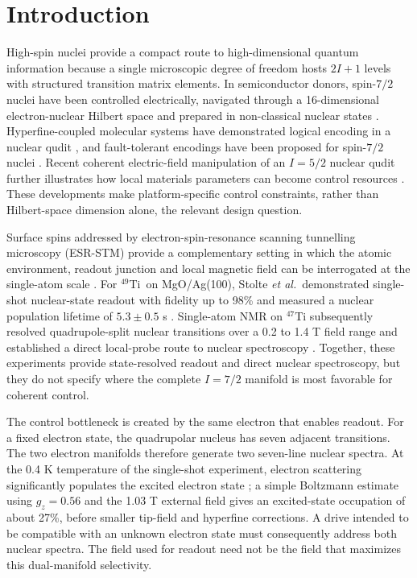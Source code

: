 \documentclass[11pt]{article}
\newcommand{\Ti}{$^{49}$Ti}
\begin{document}
\section{Introduction}
High-spin nuclei provide a compact route to high-dimensional quantum information because a single microscopic degree of freedom hosts $2I+1$ levels with structured transition matrix elements. In semiconductor donors, spin-$7/2$ nuclei have been controlled electrically, navigated through a 16-dimensional electron-nuclear Hilbert space and prepared in non-classical nuclear states \cite{asaad2020,fernandez2024,yu2025}. Hyperfine-coupled molecular systems have demonstrated logical encoding in a nuclear qudit \cite{lim2025prl}, and fault-tolerant encodings have been proposed for spin-$7/2$ nuclei \cite{lim2023pra}. Recent coherent electric-field manipulation of an $I=5/2$ nuclear qudit further illustrates how local materials parameters can become control resources \cite{lim2026electric}. These developments make platform-specific control constraints, rather than Hilbert-space dimension alone, the relevant design question.

Surface spins addressed by electron-spin-resonance scanning tunnelling microscopy (ESR-STM) provide a complementary setting in which the atomic environment, readout junction and local magnetic field can be interrogated at the single-atom scale \cite{willke2018,veldman2024}. For \Ti\ on MgO/Ag(100), Stolte \emph{et al.}\ demonstrated single-shot nuclear-state readout with fidelity up to 98\% and measured a nuclear population lifetime of $5.3\pm0.5$ s \cite{stolte2025}. Single-atom NMR on $^{47}$Ti subsequently resolved quadrupole-split nuclear transitions over a 0.2 to 1.4 T field range and established a direct local-probe route to nuclear spectroscopy \cite{vennema2025}. Together, these experiments provide state-resolved readout and direct nuclear spectroscopy, but they do not specify where the complete $I=7/2$ manifold is most favorable for coherent control.

The control bottleneck is created by the same electron that enables readout. For a fixed electron state, the quadrupolar nucleus has seven adjacent transitions. The two electron manifolds therefore generate two seven-line nuclear spectra. At the 0.4 K temperature of the single-shot experiment, electron scattering significantly populates the excited electron state \cite{stolte2025}; a simple Boltzmann estimate using $g_z=0.56$ and the 1.03 T external field gives an excited-state occupation of about 27\%, before smaller tip-field and hyperfine corrections. A drive intended to be compatible with an unknown electron state must consequently address both nuclear spectra. The field used for readout need not be the field that maximizes this dual-manifold selectivity.
\end{document}
